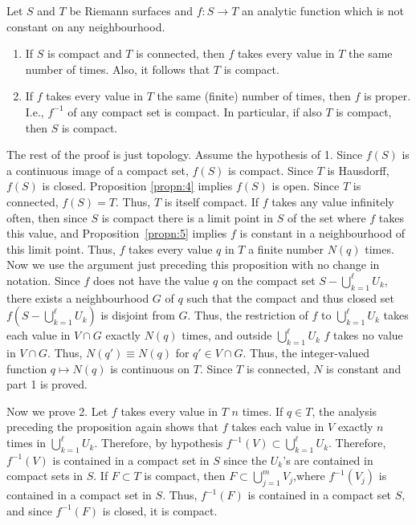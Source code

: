 \documentclass[a4paper,11pt]{article}
\begin{document}
\begin{propn}
  \label{propn:9}
  Let $S$ and $T$ be Riemann surfaces and $f : S \to T$ an analytic
  function which is not constant on any neighbourhood.
  \begin{enumerate}
  \item If $S$ is compact and $T$ is connected, then $f$ takes every
    value in $T$ the same number of times.  Also, it follows that $T$
    is compact.
  \item If $f$ takes every value in $T$ the same (finite) number of
    times, then $f$ is proper.  I.e., $f^{-1}$ of any compact set is
    compact.  In particular, if also $T$ is compact, then $S$ is
    compact.
  \end{enumerate}
\end{propn}

\begin{myproof}
  The rest of the proof is just topology.  Assume the hypothesis of
  1.  Since $f(S)$ is a continuous image of a compact set, $f(S)$ is
  compact.  Since $T$ is Hausdorff, $f(S)$ is closed.  Proposition
  \ref{propn:4} implies $f(S)$ is open.  Since $T$ is connected, 
  $f(S) = T$.  Thus, $T$ is itself compact.  If $f$ takes any value 
  infinitely often, then since $S$ is compact there is a limit point 
  in $S$ of the set where $f$ takes this value, and 
  Proposition~\ref{propn:5} implies $f$ is constant in a neighbourhood 
  of this limit point. Thus,
  $f$ takes every value $q$ in $T$ a finite number $N(q)$ times.  Now
  we use the argument just preceding this proposition with no change
  in notation.  Since $f$ does not have the value $q$ on the compact
  set $S - \bigcup_{k=1}^\ell U_k$, there exists a neighbourhood $G$
  of $q$ such that the compact and thus closed set $f(S -
  \bigcup_{k=1}^\ell U_k)$ is disjoint from $G$.  Thus, the
  restriction of $f$ to $\bigcup_{k=1}^\ell U_k$ takes each value in
  $V \cap G$ exactly $N(q)$ times, and outside $\bigcup_{k=1}^\ell
  U_k$ $f$ takes no value in $V \cap G$.  Thus, $N(q') \equiv N(q)$
  for $q' \in V\cap G$.  Thus, the integer-valued function $q \mapsto
  N(q)$ is continuous on $T$.  Since $T$ is connected, $N$ is constant
  and part 1 is proved.

  \medskip
  Now we prove 2.  Let $f$ takes every value in $T$ $n$ times.  If $q
  \in T$, the analysis preceding the proposition again shows that $f$
  takes each value in $V$ exactly $n$ times in $\bigcup_{k=1}^\ell
  U_k$.  Therefore, by hypothesis $f^{-1}(V) \subset
  \bigcup_{k=1}^\ell U_k$.  Therefore, $f^{-1}(V)$ is contained in a
  compact set in $S$ since the $U_k$'s are contained in compact sets
  in $S$.  If $F \subset T$ is compact, then $F \subset
  \bigcup_{j=1}^m V_j$,where $f^{-1}(V_j)$ is contained in a compact
  set in $S$.  Thus, $f^{-1}(F)$ is contained in a compact set $S$,
  and since $f^{-1}(F)$ is closed, it is compact.
\end{myproof}
\end{document}

